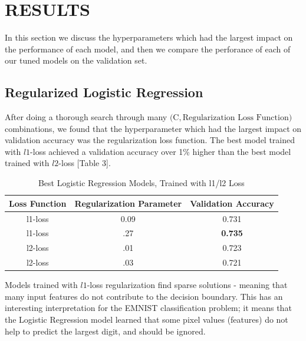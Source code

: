 \documentclass[letterpaper, 10 pt, conference]{ieeeconf}  %
\begin{document}
\section{RESULTS}

In this section we discuss the hyperparameters which had the largest impact on the performance of each model, and then we compare the perforance of each of our tuned models on the validation set. 

\subsection{Regularized Logistic Regression} 

After doing a thorough search through many $\big(\text{C}, \text{Regularization Loss Function}\big)$ combinations, we found that the hyperparameter which had the largest impact on validation accuracy was the regularization loss function. The best model trained with $l1$-loss achieved a validation accuracy over 1\% higher than the best model trained with $l2$-loss [Table 3].

\begin{table}[H]
\centering
\caption{Best Logistic Regression Models, Trained with l1/l2 Loss}
\label{my-}
\begin{tabular}{|c|c|c|}
\hline
\textbf{Loss Function} & \textbf{Regularization Parameter} & \textbf{Validation Accuracy} \\ \hline
l1-loss                & 0.09                              & 0.731                        \\ \hline
l1-loss                & .27                               & \textbf{0.735}               \\ \hline
l2-loss                & .01                               & 0.723                        \\ \hline
l2-loss                & .03                               & 0.721                        \\ \hline
\end{tabular}
\end{table}

Models trained with $l1$-loss regularization find sparse solutions - meaning that many input features do not contribute to the decision boundary. This has an interesting interpretation for the EMNIST classification problem; it means that the Logistic Regression model learned that some pixel values (features) do not help to predict the largest digit, and should be ignored.
\end{document}
